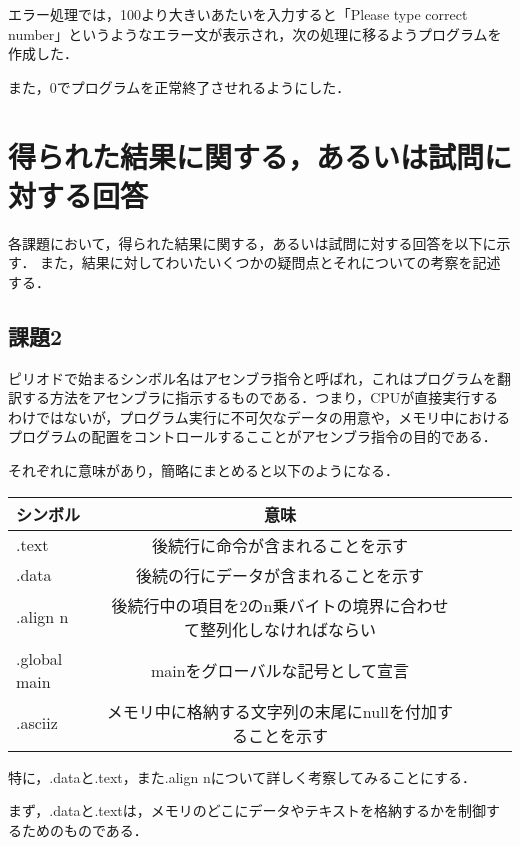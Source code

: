 \documentclass[a4j]{jarticle}
\begin{document}
エラー処理では，100より大きいあたいを入力すると「Please type correct number」というようなエラー文が表示され，次の処理に移るようプログラムを作成した．

また，0でプログラムを正常終了させれるようにした．





%
%

\section{得られた結果に関する，あるいは試問に対する回答}


各課題において，得られた結果に関する，あるいは試問に対する回答を以下に示す．
また，結果に対してわいたいくつかの疑問点とそれについての考察を記述する．


\subsection{課題2}

ピリオドで始まるシンボル名はアセンブラ指令と呼ばれ，これはプログラムを翻訳する方法をアセンブラに指示するものである．つまり，CPUが直接実行するわけではないが，プログラム実行に不可欠なデータの用意や，メモリ中におけるプログラムの配置をコントロールするこことがアセンブラ指令の目的である．

それぞれに意味があり，簡略にまとめると以下のようになる．

\begin{center}
\begin{tabular}{lclcl}\hline
シンボル&意味\\ \hline \hline
.text&後続行に命令が含まれることを示す\\ \hline
.data&後続の行にデータが含まれることを示す\\ \hline
.align n&後続行中の項目を2のn乗バイトの境界に合わせて整列化しなければならい\\ \hline
.global main&mainをグローバルな記号として宣言\\ \hline
.asciiz&メモリ中に格納する文字列の末尾にnullを付加することを示す\\ \hline
\end{tabular}
\end{center}

特に，.dataと.text，また.align nについて詳しく考察してみることにする．

まず，.dataと.textは，メモリのどこにデータやテキストを格納するかを制御するためのものである．
\end{document}
